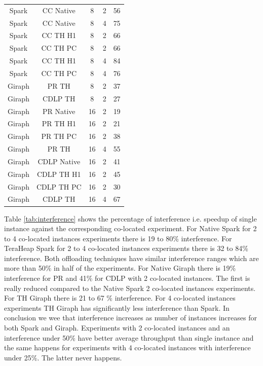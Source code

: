 \begin{table}[thbp]
\begin{tabular}{|c|c|c|c|c|}
          Spark & CC Native & 8 & 2 & 56 \\
          Spark & CC Native & 8 & 4 & 75 \\
          Spark & CC TH H1 & 8 & 2 & 66 \\
          Spark & CC TH PC & 8 & 2 & 66 \\
          Spark & CC TH H1 & 8 & 4 & 84  \\
          Spark & CC TH PC & 8 & 4 & 76 \\
	  Giraph & PR TH & 8 & 2 & 37 \\
	  Giraph & CDLP TH & 8 & 2 & 27 \\
          Giraph & PR Native & 16 & 2 & 19 \\
          Giraph & PR TH H1 & 16 & 2 & 21 \\
          Giraph & PR TH PC & 16 & 2 & 38 \\
          Giraph & PR TH & 16 & 4 & 55 \\
          Giraph & CDLP Native & 16 & 2 & 41 \\
          Giraph & CDLP TH H1 & 16 & 2 & 45 \\
          Giraph & CDLP TH PC & 16 & 2 & 30 \\
          Giraph & CDLP TH & 16 & 4 & 67 \\
    \hline
  \end{tabular}
\end{table}


Table \ref{tab:interference} shows the percentage of interference i.e. speedup of single instance against the corresponding co-located experiment. For Native Spark for 2 to 4 co-located instances experiments there is 19 to 80\% interference. For TeraHeap Spark for 2 to 4 co-located instances experiments there is 32 to 84\% interference. Both offloading techniques have similar interference ranges which are more than 50\% in half of the experiments. For Native Giraph there is 19\% interference for PR and 41\% for CDLP with 2 co-located instances. The first is really reduced compared to the Native Spark 2 co-located instances experiments. For TH Giraph there is 21 to 67 \% interference. For 4 co-located instances experiments TH Giraph has significantly less interference than Spark. In conclusion we wee that interference increases as number of instances increases for both Spark and Giraph. Experiments with 2 co-located instances and an interference under 50\% have better average throughput than single instance and the same happens for experiments with 4 co-located instances with interference under 25\%. The latter never happens.

